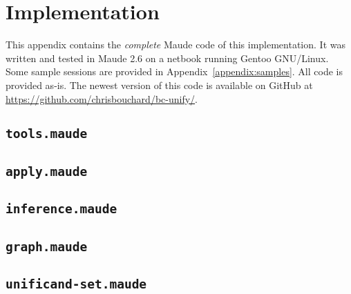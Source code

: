 \documentclass[11pt]{article}
\newcommand{\TitleListing}[1]{\texorpdfstring{\lstinline|#1|}{#1}}
\begin{document}
\newpage
\section{Implementation}\label{appendix:implementation}

This appendix contains the \emph{complete} Maude code of this implementation.
It was written and tested in Maude 2.6 on a netbook running Gentoo GNU/Linux.
Some sample sessions are provided in Appendix~\ref{appendix:samples}. All code
is provided as-is. The newest version of this code is available on GitHub at
\url{https://github.com/chrisbouchard/bc-unify/}.

\subsection{\TitleListing{tools.maude}}
\label{subappendix:tools-mod}

\vspace{2em}

\subsection{\TitleListing{apply.maude}}
\label{subappendix:apply-mod}

\vspace{2em}

\subsection{\TitleListing{inference.maude}}
\label{subappendix:inference-mod}

\vspace{2em}

\subsection{\TitleListing{graph.maude}}
\label{subappendix:graph-mod}

\vspace{2em}

\subsection{\TitleListing{unificand-set.maude}}
\label{subappendix:unificand-set-mod}

\vspace{2em}
\end{document}
